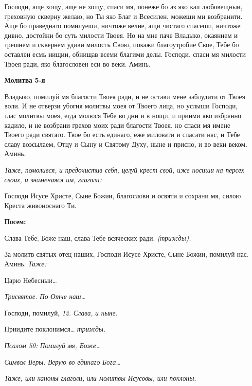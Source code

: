    Господи, аще хощу, аще не хощу, спаси мя, понеже бо аз яко кал
любовещныи, греховную скверну желаю, но Ты яко Благ и Всесилен,
можеши ми возбранити. Аще бо праведнаго помилуеши, ничтоже велие, ащи
чистаго спасеши, ничтоже дивно, достойни бо суть милости Твоея. Но на мне
паче Владыко, окаяннем и грешнем и сквернем удиви милость Свою, покажи
благоутробие Свое, Тебе бо оставлен есмь нищии, обнищав всеми благими
делы. Господи, спаси мя милости Твоея ради, яко благословен еси во веки.
Аминь.



 

\bfseries Молитва 5-я\normalfont{}


   Владыко, помилуй мя благости Твоея ради, и не остави мене заблудити
от Твоея воли. И не отверзи убогия молитвы моея от Твоего лица, но
услыши Господи, глас молитвы моея, егда молюся Тебе во дни и в нощи, и
приими яко избранно кадило, и не возбрани грехов моих ради благости
Твоея, но спаси мя имене Твоего ради святаго. Твое бо есть единаго, еже
миловати и спасати нас, и Тебе славу возсылаем, Отцу и Сыну и Святому
Духу, ныне и присно, и во веки веком. Аминь.


 \itshape Таже, помолився, и предочистив себя, целуй крест свой, иже носиши на
персех своих, и знаменаяся им, глаголи:\normalfont{}


   Господи Исусе Христе, Сыне Божии, благослови и освяти и сохрани мя,
силою Креста живоноснаго Ти.



 

\bfseries Посем:\normalfont{}


   Слава Тебе, Боже наш, слава Тебе всяческих ради. \itshape (трижды)\normalfont{}.


   За молитв святых отец наших, Господи Исусе Христе, Сыне Божии,
помилуй нас. Аминь. \itshape Таже:\normalfont{}


   Царю Небесныи…


 \itshape Трисвятое\normalfont{}. \itshape По\normalfont{} Отче наш…


   Господи, помилуй, \itshape 12\normalfont{}. \itshape Слава, и ныне.\normalfont{}


   Приидите поклонимся… \itshape трижды\normalfont{}.


 \itshape Псалом 50:\normalfont{} Помилуй мя, Боже…


 \itshape Символ Веры:\normalfont{} Верую во единаго Бога…


 \itshape Таже, или каноны глаголи, или молитвы Исусовы, или поклоны.\normalfont{}


